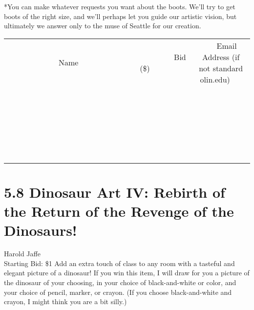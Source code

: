 \documentclass[11pt]{article}
\begin{document}
*You can make whatever requests you want about the boots. We'll try to get boots of the right size, and we'll perhaps let you guide our artistic vision, but ultimately we answer only to the muse of Seattle for our creation.
\\[6ex]
\begin{tabular}{c c c}
~~~~~~~~~~~~~Name~~~~~~~~~~~~~ & ~~~~~~~~~Bid (\$)~~~~~~~~~  & ~~~Email Address (if not standard olin.edu)~~~\\
 & & \\
\hline
 & & \\
\hline
 & & \\
\hline
 & & \\
\hline
 & & \\
\hline
 & & \\
\hline
 & & \\
\hline
 & & \\
\hline
 & & \\
\hline
 & & \\
\hline
 & & \\
\hline
 & & \\
\hline
 & & \\
\hline
 & & \\
\hline
 & & \\
\hline
 & & \\
\hline
 & & \\
\hline
 & & \\
\hline
 & & \\
\hline
 & & \\
\hline
 & & \\
\hline
 & & \\
\hline
 & & \\
\hline
 & & \\
\hline
 & & \\
\hline
 & & \\
\hline
\end{tabular}
\newpage
\section*{5.8 Dinosaur Art IV: Rebirth of the Return of the Revenge of the Dinosaurs!}
Harold Jaffe
\\
Starting Bid: \$1
\newline
Add an extra touch of class to any room with a tasteful and elegant picture of a dinosaur! If you win this item, I will draw for you a picture of the dinosaur of your choosing, in your choice of black-and-white or color, and your choice of pencil, marker, or crayon. (If you choose black-and-white and crayon, I might think you are a bit silly.)
\end{document}
